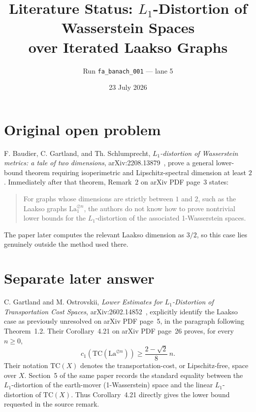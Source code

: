 \documentclass[11pt]{article}
\title{Literature Status: \(L_1\)-Distortion of Wasserstein Spaces\\
over Iterated Laakso Graphs}
\author{Run \texttt{fa\_banach\_001} --- lane 5}
\date{23 July 2026}
\begin{document}
\maketitle

\begin{center}
\end{center}

\section{Original open problem}

F. Baudier, C. Gartland, and Th. Schlumprecht,
\emph{\(L_1\)-distortion of Wasserstein metrics: a tale of two dimensions},
arXiv:2208.13879~\cite{source}, prove a general lower-bound theorem requiring
isoperimetric and Lipschitz-spectral dimension at least \(2\).
Immediately after that theorem, Remark~2 on arXiv PDF page~3 states:

\begin{quote}
For graphs whose dimensions are strictly between \(1\) and \(2\), such as
the Laakso graphs \(\mathrm{La}_1^{\oslash n}\), the authors do not know how
to prove nontrivial lower bounds for the \(L_1\)-distortion of the associated
1-Wasserstein spaces.
\end{quote}

The paper later computes the relevant Laakso dimension as \(3/2\), so this
case lies genuinely outside the method used there.

\section{Separate later answer}

C. Gartland and M. Ostrovskii,
\emph{Lower Estimates for \(L_1\)-Distortion of Transportation Cost
Spaces}, arXiv:2602.14852~\cite{answerpaper}, explicitly identify the
Laakso case as previously unresolved on arXiv PDF page~5, in the paragraph
following Theorem~1.2.  Their Corollary~4.21 on arXiv PDF page~26 proves,
for every \(n\geq0\),
\[
 c_1\!\left(\mathrm{TC}(\mathrm{La}^{\oslash n})\right)
 \geq \frac{2-\sqrt 2}{8}\,n .
\]
Their notation \(\mathrm{TC}(X)\) denotes the transportation-cost, or
Lipschitz-free, space over \(X\).  Section~5 of the same paper records the
standard equality between the \(L_1\)-distortion of the earth-mover
(1-Wasserstein) space and the linear \(L_1\)-distortion of
\(\mathrm{TC}(X)\).  Thus Corollary~4.21 directly gives the lower bound
requested in the source remark.
\end{document}
